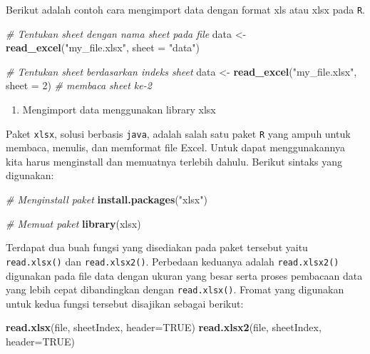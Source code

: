 \documentclass[]{book}
\newenvironment{Shaded}{\begin{snugshade}}{\end{snugshade}}
\newcommand{\KeywordTok}[1]{\textcolor[rgb]{0.13,0.29,0.53}{\textbf{#1}}}
\newcommand{\DataTypeTok}[1]{\textcolor[rgb]{0.13,0.29,0.53}{#1}}
\newcommand{\DecValTok}[1]{\textcolor[rgb]{0.00,0.00,0.81}{#1}}
\newcommand{\StringTok}[1]{\textcolor[rgb]{0.31,0.60,0.02}{#1}}
\newcommand{\CommentTok}[1]{\textcolor[rgb]{0.56,0.35,0.01}{\textit{#1}}}
\newcommand{\OtherTok}[1]{\textcolor[rgb]{0.56,0.35,0.01}{#1}}
\newcommand{\NormalTok}[1]{#1}
\providecommand{\tightlist}{%
  \setlength{\itemsep}{0pt}\setlength{\parskip}{0pt}}
\begin{document}
Berikut adalah contoh cara mengimport data dengan format xls atau xlsx
pada \texttt{R}.

\begin{Shaded}
\begin{Highlighting}[]
\CommentTok{# Tentukan sheet dengan nama sheet pada file}
\NormalTok{data <-}\StringTok{ }\KeywordTok{read_excel}\NormalTok{(}\StringTok{"my_file.xlsx"}\NormalTok{, }\DataTypeTok{sheet =} \StringTok{"data"}\NormalTok{)}

\CommentTok{# Tentukan sheet berdasarkan indeks sheet}
\NormalTok{data <-}\StringTok{ }\KeywordTok{read_excel}\NormalTok{(}\StringTok{"my_file.xlsx"}\NormalTok{, }\DataTypeTok{sheet =} \DecValTok{2}\NormalTok{) }\CommentTok{# membaca sheet ke-2}
\end{Highlighting}
\end{Shaded}

\begin{enumerate}
\def\labelenumi{\alph{enumi}.}
\setcounter{enumi}{3}
\tightlist
\item
  Mengimport data menggunakan library xlsx
\end{enumerate}

Paket \texttt{xlsx}, solusi berbasis \texttt{java}, adalah salah satu
paket \texttt{R} yang ampuh untuk membaca, menulis, dan memformat file
Excel. Untuk dapat menggunakannya kita harus menginstall dan memuatnya
terlebih dahulu. Berikut sintaks yang digunakan:

\begin{Shaded}
\begin{Highlighting}[]
\CommentTok{# Menginstall paket}
\KeywordTok{install.packages}\NormalTok{(}\StringTok{"xlsx"}\NormalTok{)}

\CommentTok{# Memuat paket}
\KeywordTok{library}\NormalTok{(xlsx)}
\end{Highlighting}
\end{Shaded}

Terdapat dua buah fungsi yang disediakan pada paket tersebut yaitu
\texttt{read.xlsx()} dan \texttt{read.xlsx2()}. Perbedaan keduanya
adalah \texttt{read.xlsx2()} digunakan pada file data dengan ukuran yang
besar serta proses pembacaan data yang lebih cepat dibandingkan dengan
\texttt{read.xlsx()}. Fromat yang digunakan untuk kedua fungsi tersebut
disajikan sebagai berikut:

\begin{Shaded}
\begin{Highlighting}[]
\KeywordTok{read.xlsx}\NormalTok{(file, sheetIndex, }\DataTypeTok{header=}\OtherTok{TRUE}\NormalTok{)}
\KeywordTok{read.xlsx2}\NormalTok{(file, sheetIndex, }\DataTypeTok{header=}\OtherTok{TRUE}\NormalTok{)}
\end{Highlighting}
\end{Shaded}
\end{document}
